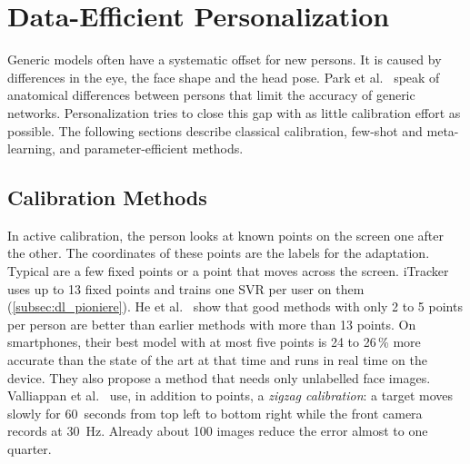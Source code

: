 \section{Data-Efficient Personalization}
\label{sec:personalisierung}
Generic models often have a systematic offset for new persons. It is caused by
differences in the eye, the face shape and the head pose. Park et
al.~\cite{park2019faze} speak of anatomical differences between persons that
limit the accuracy of generic networks. Personalization tries to close this gap
with as little calibration effort as possible. The following sections describe
classical calibration, few-shot and meta-learning, and parameter-efficient
methods.

\subsection{Calibration Methods}
\label{subsec:kalibrierung}
In active calibration, the person looks at known points on the screen one after
the other. The coordinates of these points are the labels for the adaptation.
Typical are a few fixed points or a point that moves across the screen.
iTracker~\cite{krafka2016itracker} uses up to 13 fixed points and trains one
SVR per user on them (\cref{subsec:dl_pioniere}). He et
al.~\cite{he2019ondevice} show that good methods with only 2 to 5 points per
person are better than earlier methods with more than 13 points. On
smartphones, their best model with at most five points is 24 to 26\,\% more
accurate than the state of the art at that time and runs in real time on the
device. They also propose a method that needs only unlabelled face images.
Valliappan et al.~\cite{valliappan2020smartphone} use, in addition to points, a
\emph{zigzag calibration}: a target moves slowly for 60~seconds from top left
to bottom right while the front camera records at \SI{30}{\hertz}. Already
about 100 images reduce the error almost to one quarter.

